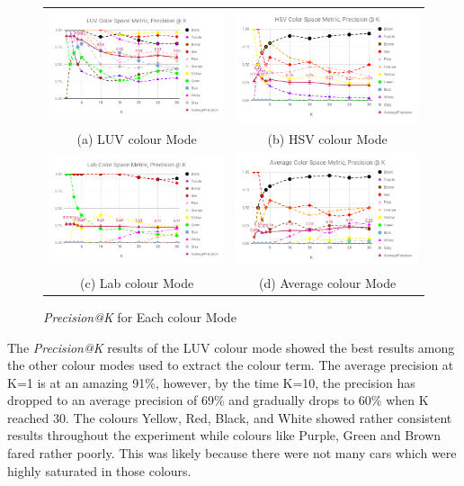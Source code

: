 \begin{figure}[htb!]
  \centering
\begin{tabular}{cc}
 \includegraphics[width=0.5\linewidth]{image/new/luv@k.png} &
 \includegraphics[width=0.5\linewidth]{image/new/hsv@k.png}\\
 (a) LUV colour Mode &
 (b) HSV colour Mode \\
 \includegraphics[width=0.5\linewidth]{image/new/lab@k.png} &
 \includegraphics[width=0.5\linewidth]{image/new/avg@k.png} \\
 (c) Lab colour Mode&
 (d) Average colour Mode \\
\end{tabular}
\caption{\textit{Precision@K} for Each colour Mode} \label{fig:colorspace_score}
\end{figure}

The \textit{Precision@K} results of the LUV colour mode showed the best results among the other colour modes used to extract the colour term. The average precision at K=1 is at an amazing 91\%, however, by the time K=10, the precision has dropped to an average precision of 69\% and gradually drops to 60\% when K reached 30. The colours Yellow, Red, Black, and White showed rather consistent results throughout the experiment while colours like Purple, Green and Brown fared rather poorly. This was likely because there were not many cars which were highly saturated in those colours.

